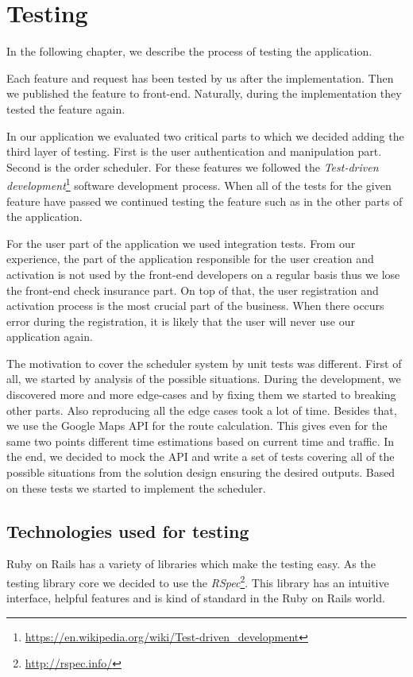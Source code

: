 \chapter{Testing}
In the following chapter, we describe the process of testing the application. 

Each feature and request has been tested by us after the implementation. Then we published the feature to front-end. Naturally, during the implementation they tested the feature again.

In our application we evaluated two critical parts to which we decided adding the third layer of testing. First is the user authentication and manipulation part. Second is the order scheduler. For these features we followed the \textit{Test-driven development}\footnote{\url{https://en.wikipedia.org/wiki/Test-driven_development}} software development process. When all of the tests for the given feature have passed we continued testing the feature such as in the other parts of the application.

For the user part of the application we used integration tests. From our experience, the part of the application responsible for the user creation and activation is not used by the front-end developers on a regular basis thus we lose the front-end check insurance part. On top of that, the user registration and activation process is the most crucial part of the business. When there occurs error during the registration, it is likely that the user will never use our application again.  

The motivation to cover the scheduler system by unit tests was different. First of all, we started by analysis of the possible situations. During the development, we discovered more and more edge-cases and by fixing them we started to breaking other parts. Also reproducing all the edge cases took a lot of time. Besides that, we use the Google Maps API for the route calculation. This gives even for the same two points different time estimations based on current time and traffic. In the end, we decided to mock the API and write a set of tests covering all of the possible situations from the solution design ensuring the desired outputs. Based on these tests we started to implement the scheduler. 
 

\section{Technologies used for testing}

Ruby on Rails has a variety of libraries which make the testing easy. As the testing library core we decided to use the \textit{RSpec}\footnote{\url{http://rspec.info/}}. This library has an intuitive interface, helpful features and is kind of standard in the Ruby on Rails world.


